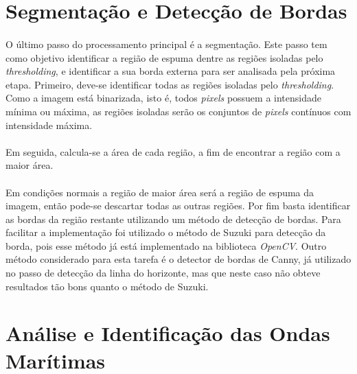 \section{Segmentação e Detecção de Bordas}

\paragraph{}O último passo do processamento principal é a segmentação. Este passo tem como objetivo identificar a região de espuma dentre as regiões isoladas pelo \textit{thresholding}, e identificar a sua borda externa para ser analisada pela próxima etapa. Primeiro, deve-se identificar todas as regiões isoladas pelo \textit{thresholding}. Como a imagem está binarizada, isto é, todos \textit{pixels} possuem a intensidade mínima ou máxima, as regiões isoladas serão os conjuntos de \textit{pixels} contínuos com intensidade máxima. 


\paragraph{}Em seguida, calcula-se a área de cada região, a fim de encontrar a região com a maior área. 


\paragraph{}Em condições normais a região de maior área será a região de espuma da imagem, então pode-se descartar todas as outras regiões. Por fim basta identificar as bordas da região restante utilizando um método de detecção de bordas. Para facilitar a implementação foi utilizado o método de Suzuki \cite{Suzuki85} para detecção da borda, pois esse método já está implementado na biblioteca \textit{OpenCV}. Outro método considerado para esta tarefa é o detector de bordas de Canny, já utilizado no passo de detecção da linha do horizonte, mas que neste caso não obteve resultados tão bons quanto o método de Suzuki.


\section{Análise e Identificação das Ondas Marítimas}

